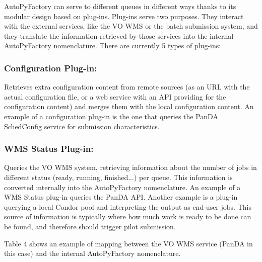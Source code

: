\documentclass[a4paper]{jpconf}
\begin{document}
AutoPyFactory can serve to different queues in different ways 
thanks to its modular design based on plug-ins. 
Plug-ins serve two purposes. 
They interact with the external services, like the VO WMS or the batch submission system,
and they translate the information retrieved by those services into the internal AutoPyFactory nomenclature.
There are currently 5 types of plug-ins:


\subsubsection{Configuration Plug-in:}

Retrieves extra configuration content from remote sources 
(as an URL with the actual configuration file, or a web service with an API providing for the configuration content)
and merges them with the local configuration content.
An example of a configuration plug-in is the one that queries the PanDA
SchedConfig service for submission characteristics.


\subsubsection{WMS Status Plug-in:}
Queries the VO WMS system, 
retrieving information about the number of jobs in different status (ready, running, finished...) per queue.
This information is converted internally into the AutoPyFactory nomenclature.
An example of a WMS Status plug-in queries the PanDA API.
Another example is a plug-in querying a local Condor pool and interpreting the
output as end-user jobs. This source of information is typically where 
how much work is ready to be done can be found, and therefore should trigger pilot
submission. 


Table 4 shows an example of mapping between the VO WMS service 
(PanDA in this case)
and the internal AutoPyFactory nomenclature.
\end{document}
